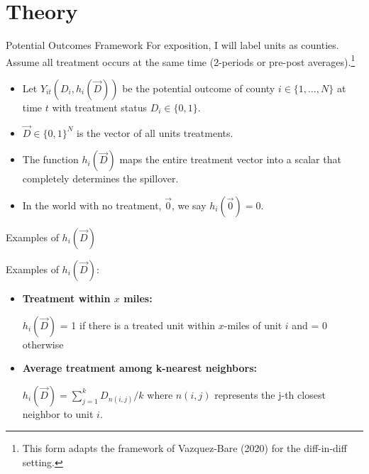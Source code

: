 \documentclass[aspectratio=169]{beamer}
\begin{document}





\section{Theory}

\begin{frame}{Potential Outcomes Framework}
    For exposition, I will label units as counties. Assume all treatment occurs at the same time (2-periods or pre-post averages).\footnote{This form adapts the framework of Vazquez-Bare (2020) for the diff-in-diff setting.}
    
    \begin{itemize}
        \item Let $Y_{it}(D_i, h_i(\vec{D}))$ be the potential outcome of county $i \in \{ 1, \dots, N \}$ at time $t$ with treatment status $D_i \in \{0, 1\}$.
        
        \item $\vec{D} \in \{0,1\}^N$ is the vector of all units treatments.
        
        \item The function $h_i(\vec{D})$ maps the entire treatment vector into a scalar that completely determines the spillover. 
        
        \item In the world with no treatment, $\vec{0}$, we say $h_i(\vec{0}) = 0$.
    \end{itemize}
\end{frame}

\begin{frame}{Examples of $h_i(\vec{D})$}
    
    Examples of $h_i(\vec{D})$:
    
    \begin{itemize}
        \item \textbf{Treatment within $x$ miles:}
        
        $h_i(\vec{D})$ = 1 if there is a treated unit within $x$-miles of unit $i$ and = 0 otherwise
            
        \item \textbf{Average treatment among k-nearest neighbors:}
        
        $h_i(\vec{D}) = \sum_{j = 1}^k D_{n(i,j)} / k$ where $n(i,j)$ represents the j-th closest neighbor to unit $i$. 


    \end{itemize}
\end{frame}
\end{document}
